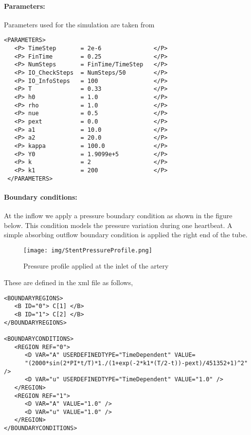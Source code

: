 \paragraph{Parameters:~} Parameters used for the simulation are taken from \cite{ShFoPeFr03} 
\begin{lstlisting}[style=XMLStyle] 
<PARAMETERS>
   <P> TimeStep       = 2e-6               </P> 
   <P> FinTime        = 0.25               </P>
   <P> NumSteps       = FinTime/TimeStep   </P>
   <P> IO_CheckSteps  = NumSteps/50        </P>
   <P> IO_InfoSteps   = 100                </P>
   <P> T              = 0.33               </P>
   <P> h0             = 1.0                </P>
   <P> rho            = 1.0                </P>
   <P> nue            = 0.5                </P>
   <P> pext           = 0.0                </P> 
   <P> a1             = 10.0               </P> 
   <P> a2             = 20.0               </P> 
   <P> kappa          = 100.0              </P> 
   <P> Y0             = 1.9099e+5          </P> 
   <P> k              = 2                  </P> 
   <P> k1             = 200                </P> 
 </PARAMETERS>
\end{lstlisting}

\paragraph{Boundary conditions:~} At the inflow we apply a pressure boundary condition as shown in the figure below. This condition models the pressure variation during one heartbeat. A simple absorbing outflow boundary condition is applied the right end of the tube.

\begin{figure}
\begin{center}
\texttt{[image: img/StentPressureProfile.png]}
\caption{Pressure profile applied at the inlet of the artery}
\end{center}
\end{figure}

These are defined in the xml file as follows,
\begin{lstlisting}[style=XMLStyle] 
<BOUNDARYREGIONS>
   <B ID="0"> C[1] </B>
   <B ID="1"> C[2] </B>
</BOUNDARYREGIONS>

<BOUNDARYCONDITIONS>
   <REGION REF="0">
      <D VAR="A" USERDEFINEDTYPE="TimeDependent" VALUE=
      "(2000*sin(2*PI*t/T)*1./(1+exp(-2*k1*(T/2-t))-pext)/451352+1)^2" />
      <D VAR="u" USERDEFINEDTYPE="TimeDependent" VALUE="1.0" />
   </REGION>
   <REGION REF="1">
      <D VAR="A" VALUE="1.0" />
      <D VAR="u" VALUE="1.0" />
   </REGION>
</BOUNDARYCONDITIONS>
\end{lstlisting}

